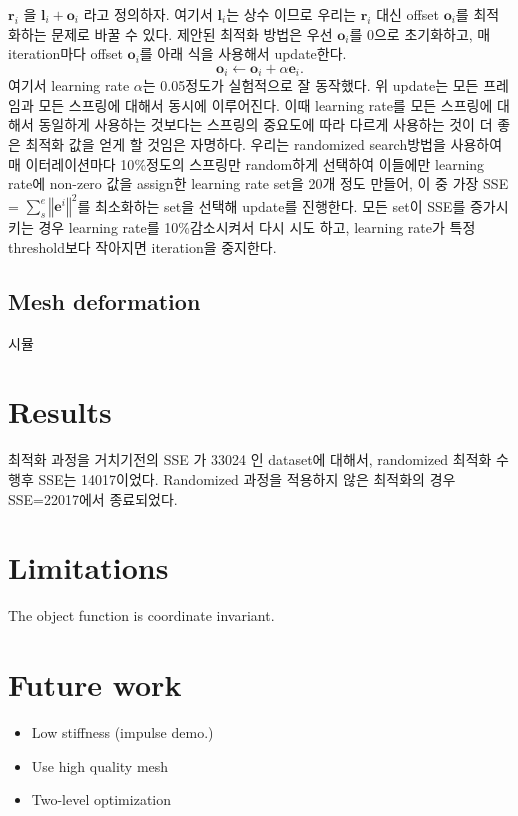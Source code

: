 \documentclass[11pt,a4paper]{article}
\begin{document}
$\mathbf r_i$ 을 $\mathbf l_i+\mathbf o_i$ 라고 정의하자. 여기서 $\mathbf l_i$는 상수 이므로 우리는 $\mathbf r_i$ 대신 offset $\mathbf o_i$를 최적화하는 문제로 바꿀 수 있다. 제안된 최적화 방법은 우선 $\mathbf o_i$를 0으로 초기화하고, 매 iteration마다 offset $\mathbf o_i$를 아래 식을 사용해서 update한다.
\begin{equation}
\mathbf o_i \leftarrow \mathbf o_i + \alpha\mathbf e_i.
\end{equation}
여기서 learning rate $\alpha$는 0.05정도가 실험적으로 잘 동작했다. 위 update는 모든 프레임과 모든 스프링에 대해서 동시에 이루어진다. 이때 learning rate를 모든 스프링에 대해서 동일하게 사용하는 것보다는 스프링의 중요도에 따라 다르게 사용하는 것이 더 좋은 최적화 값을 얻게 할 것임은 자명하다. 우리는 randomized search방법을 사용하여 매 이터레이션마다 10$\%$정도의 스프링만 random하게 선택하여 이들에만 learning rate에 non-zero 값을 assign한 learning rate set을 20개 정도 만들어, 이 중 가장 SSE = $\sum_s^e\left\Vert\mathbf e^i\right\Vert^2$를 최소화하는 set을 선택해 update를 진행한다. 모든 set이 SSE를 증가시키는 경우 learning rate를 10\%감소시켜서 다시 시도 하고, learning rate가 특정 threshold보다 작아지면 iteration을 중지한다.

\subsection{Mesh deformation}
시뮬

\section{Results}

최적화 과정을 거치기전의 SSE 가 33024 인 dataset에 대해서, randomized 최적화 수행후 SSE는 14017이었다. Randomized 과정을 적용하지 않은 최적화의 경우 SSE=22017에서 종료되었다.



\section{Limitations }
The object function is coordinate invariant. 
\section{Future work}
\begin{itemize}
\item {Low stiffness (impulse demo.) }
\item{Use high quality mesh}
\item {Two-level optimization }
\end{itemize}
\end{document}
